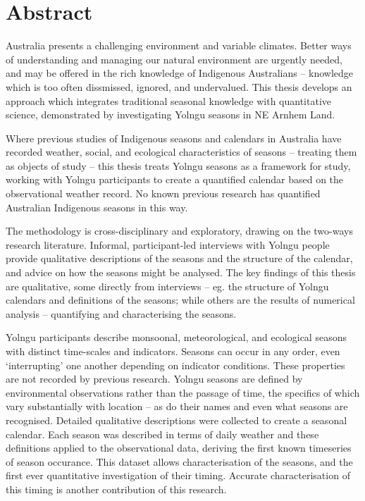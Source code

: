 \chapter{Abstract}

Australia presents a challenging environment and variable climates.
Better ways of understanding and managing our natural environment are urgently needed, and
may be offered in the rich knowledge of Indigenous Australians -- knowledge which
is too often dissmissed, ignored, and undervalued.
%
This thesis develops an approach which integrates traditional seasonal knowledge
with quantitative science, demonstrated by investigating Yolngu
seasons in NE Arnhem Land.

Where previous studies of Indigenous seasons and calendars in Australia have
recorded weather, social, and ecological characteristics of seasons -- treating
them as objects of study -- this thesis treats Yolngu seasons as a framework
for study, working with Yolngu participants to create a quantified calendar
based on the observational weather record.  No known previous research has quantified
Australian Indigenous seasons in this way.


The methodology is cross-disciplinary and exploratory, drawing on the two-ways
research literature.  Informal, participant-led interviews with Yolngu people
provide qualitative descriptions of the seasons and the structure of the
calendar, and advice on how the seasons might be analysed.
%
The key findings of this thesis are qualitative, some directly from interviews
-- eg. the structure of Yolngu calendars and definitions of the seasons; while
others are the results of numerical analysis -- quantifying and characterising the seasons.


Yolngu participants describe monsoonal, meteorological, and ecological
seasons with distinct time-scales and indicators.  Seasons can occur in any
order, even `interrupting' one another depending on indicator conditions.
These properties are not recorded by previous research.
%
Yolngu seasons are defined by environmental observations rather than the
passage of time, the specifics of which vary substantially with location --
as do their names and even what seasons are recognised.  Detailed qualitative
descriptions were collected to create a seasonal calendar.
%
Each season was described in terms of daily weather and these definitions
applied to the observational data, deriving the first known timeseries of
season occurance.  This dataset allows characterisation of the seasons,
and the first ever quantitative investigation of their timing.  Accurate
characterisation of this timing is another contribution of this research.

